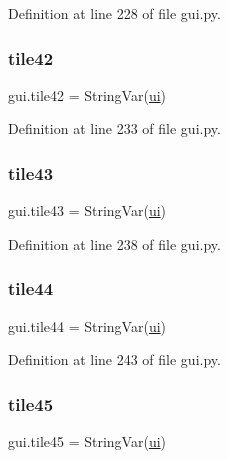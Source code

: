 Definition at line 228 of file gui.\+py.

\mbox{\label{namespacegui_acaf018b80c58203097d99ae83972c532}} 
\subsubsection{\texorpdfstring{tile42}{tile42}}
{\footnotesize\ttfamily gui.\+tile42 = String\+Var(\mbox{\hyperlink{namespacegui_a40ab7281456eadbea2dc2038f5c24fa1}{ui}})}



Definition at line 233 of file gui.\+py.

\mbox{\label{namespacegui_a4b23364a860cd384c4f910c6144a213e}} 
\subsubsection{\texorpdfstring{tile43}{tile43}}
{\footnotesize\ttfamily gui.\+tile43 = String\+Var(\mbox{\hyperlink{namespacegui_a40ab7281456eadbea2dc2038f5c24fa1}{ui}})}



Definition at line 238 of file gui.\+py.

\mbox{\label{namespacegui_af46f15a9a3ebad6b6b8e98adb5eb0f2d}} 
\subsubsection{\texorpdfstring{tile44}{tile44}}
{\footnotesize\ttfamily gui.\+tile44 = String\+Var(\mbox{\hyperlink{namespacegui_a40ab7281456eadbea2dc2038f5c24fa1}{ui}})}



Definition at line 243 of file gui.\+py.

\mbox{\label{namespacegui_ac936253f399ab927a2fd3a8b1be73902}} 
\subsubsection{\texorpdfstring{tile45}{tile45}}
{\footnotesize\ttfamily gui.\+tile45 = String\+Var(\mbox{\hyperlink{namespacegui_a40ab7281456eadbea2dc2038f5c24fa1}{ui}})}



